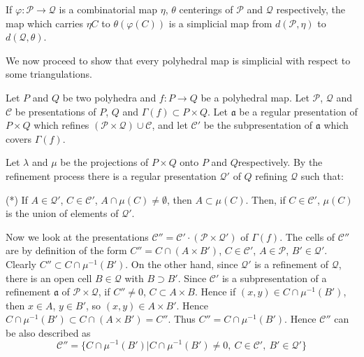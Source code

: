 \begin{example}\label{chap1-exam2.2.3}
If $\varphi:\mathscr{P}\to \mathcal{Q}$ is a combinatorial map $\eta$, $\theta$ centerings of $\mathscr{P}$ and $\mathcal{Q}$ respectively, the map which carries $\eta C$ to $\theta(\varphi(C))$ is a simplicial map from $d(\mathscr{P},\eta)$ to $d(\mathcal{Q},\theta)$.
\end{example}

We now proceed to show that every polyhedral map is simplicial with respect to some triangulations.

Let $P$ and $Q$ be two polyhedra and $f:P\to Q$ be a polyhedral map. Let $\mathscr{P}$, $\mathcal{Q}$ and $\mathscr{C}$ be presentations of $P$, $Q$ and $\Gamma(f)\subset P\times Q$. Let $\mathfrak{a}$ be a regular presentation of $P\times Q$ which refines $(\mathscr{P}\times \mathcal{Q})\cup \mathscr{C}$, and let $\mathscr{C}'$ be the subpresentation of $\mathfrak{a}$ which covers $\Gamma(f)$.

Let $\lambda$ and $\mu$ be the projections of $P\times Q$ onto $P$ and $Q$\pageoriginale respectively. By the refinement process there is a regular presentation $\mathcal{Q}'$ of $Q$ refining $\mathcal{Q}$ such that:

(*) If $A\in \mathcal{Q}'$, $C\in \mathscr{C}'$, $A\cap \mu(C)\neq \emptyset$, then $A\subset \mu(C)$. Then, if $C\in\mathscr{C}'$, $\mu(C)$ is the union of elements of $\mathcal{Q}'$.

Now we look at the presentations $\mathscr{C}''=\mathscr{C}'\cdot (\mathscr{P}\times \mathcal{Q}')$ of $\Gamma(f)$. The cells of $\mathscr{C}''$ are by definition of the form $C''=C\cap (A\times B')$, $C\in \mathscr{C}'$, $A\in \mathscr{P}$, $B'\in \mathcal{Q}'$. Clearly $C''\subset C\cap \mu^{-1}(B')$. On the other hand, since $\mathcal{Q}'$ is a refinement of $\mathcal{Q}$, there is an open cell $B\in \mathcal{Q}$ with $B\supset B'$. Since $\mathscr{C}'$ is a subpresentation of a refinement $\mathfrak{a}$ of $\mathscr{P}\times \mathcal{Q}$, if $C''\neq 0$, $C\subset A\times B$. Hence if $(x,y)\in C\cap \mu^{-1}(B')$, then $x\in A$, $y\in B'$, so $(x,y)\in A\times B'$. Hence $C\cap \mu^{-1}(B')\subset C\cap (A\times B')=C''$. Thus $C''=C\cap \mu^{-1}(B')$. Hence $\mathscr{C}''$ can be also described as
$$
\mathscr{C}''= \Big\{C\cap \mu^{-1}(B')|C\cap\mu^{-1}(B')\neq 0,\ C\in \mathscr{C}',\ B'\in \mathcal{Q}'\Big\}
$$

